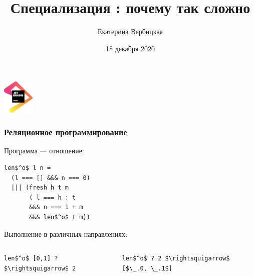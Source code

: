 \documentclass{beamer}
\title[]{Специализация \miniKanren: почему так сложно}
\institute[]{
Лаборатория языковых инструментов JetBrains
}
\author[Екатерина Вербицкая]{Екатерина Вербицкая}
\date{18 декабря 2020}
\begin{document}
{

\begin{frame}
      \begin{center}
        {\includegraphics[width=1.5cm]{pics/jb.png}}
      \end{center}

  \titlepage
\end{frame}
}

\begin{frame}[fragile]
  \frametitle{Реляционное программирование}

 \begin{center}
    Программа --- отношение:
 \end{center}

 \vspace{0.1cm}

  \begin{center}
    \begin{minipage}{3.5cm}
    \begin{lstlisting}[frame=single]
len$^o$ l n =
  (l === [] &&& n === 0)
  ||| (fresh h t m
       ( l === h : t
       &&& n === 1 + m
       &&& len$^o$ t m))
    \end{lstlisting}
    \end{minipage}
\end{center}

\vspace{0.3cm}

\begin{center}
  Выполнение в различных направлениях:
\end{center}

\vspace{-0.1cm}

\begin{columns}
  \begin{column}{0.45\textwidth}
    \begin{center}
      \begin{minipage}{0.45\textwidth}
        \lstinline{len$^o$ [0,1] ? $\rightsquigarrow$ 2}
      \end{minipage}
    \end{center}
  \end{column}
  \begin{column}{0.55\textwidth}
    \begin{center}
      \begin{minipage}{0.55\textwidth}
        \lstinline{len$^o$ ? 2 $\rightsquigarrow$ [$\_.0, \_.1$]}
      \end{minipage}
    \end{center}
  \end{column}
\end{columns}

\end{frame}
\end{document}
